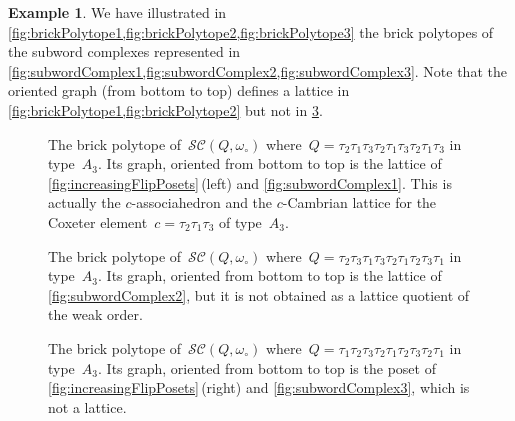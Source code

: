 \documentclass[reqno]{amsart}
\theoremstyle{definition}
\newtheorem{example}[theorem]{Example}
\newcommand{\wo}{\omega_\circ} %
\newcommand{\subwordComplex}{\mathcal{SC}} %
\begin{document}
\begin{example}
We have illustrated in \cref{fig:brickPolytope1,fig:brickPolytope2,fig:brickPolytope3} the brick polytopes of the subword complexes represented in \cref{fig:subwordComplex1,fig:subwordComplex2,fig:subwordComplex3}.
Note that the oriented graph (from bottom to top) defines a lattice in \cref{fig:brickPolytope1,fig:brickPolytope2} but not in \cref{fig:brickPolytope3}.
%
\begin{figure}[p]
	\centerline{}
	\caption{The brick polytope of~$\subwordComplex(Q,\wo)$ where~$Q = \tau_2 \tau_1 \tau_3 \tau_2 \tau_1 \tau_3 \tau_2 \tau_1 \tau_3$ in type~$A_3$. Its graph, oriented from bottom to top is the lattice of \cref{fig:increasingFlipPosets}\,(left) and \cref{fig:subwordComplex1}. This is actually the $c$-associahedron and the $c$-Cambrian lattice for the Coxeter element~$c = \tau_2\tau_1\tau_3$ of type~$A_3$.}
	\label{fig:brickPolytope1}
\end{figure}
%
\begin{figure}[p]
	\centerline{}
	\caption{The brick polytope of~$\subwordComplex(Q,\wo)$ where~$Q = \tau_2 \tau_3 \tau_1 \tau_3 \tau_2 \tau_1 \tau_2 \tau_3 \tau_1$ in type~$A_3$. Its graph, oriented from bottom to top is the lattice of \cref{fig:subwordComplex2}, but it is not obtained as a lattice quotient of the weak order.}
	\label{fig:brickPolytope2}
\end{figure}
%
\begin{figure}[p]
	\centerline{}
	\caption{The brick polytope of~$\subwordComplex(Q,\wo)$ where~$Q = \tau_1 \tau_2 \tau_3 \tau_2 \tau_1 \tau_2 \tau_3 \tau_2 \tau_1$ in type~$A_3$. Its graph, oriented from bottom to top is the poset of \cref{fig:increasingFlipPosets}\,(right) and \cref{fig:subwordComplex3}, which is not a lattice.}
	\label{fig:brickPolytope3}
\end{figure}
\end{example}

\end{document}

